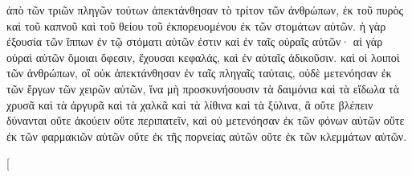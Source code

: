 \begin{pages}
\begin{Rightside}
		\pend
		\pstart
		ἀπὸ τῶν τριῶν πληγῶν τούτων ἀπεκτάνθησαν τὸ τρίτον τῶν ἀνθρώπων, ἐκ τοῦ πυρὸς καὶ τοῦ καπνοῦ καὶ τοῦ θείου τοῦ ἐκπορευομένου ἐκ τῶν στομάτων αὐτῶν. ἡ γὰρ ἐξουσία τῶν ἵππων ἐν τῷ στόματι αὐτῶν ἐστιν καὶ ἐν ταῖς οὐραῖς αὐτῶν· αἱ γὰρ οὐραὶ αὐτῶν ὅμοιαι ὄφεσιν, ἔχουσαι κεφαλάς, καὶ ἐν αὐταῖς ἀδικοῦσιν.
		\pend
		\pstart
		καὶ οἱ λοιποὶ τῶν ἀνθρώπων, οἳ οὐκ ἀπεκτάνθησαν ἐν ταῖς πληγαῖς ταύταις, οὐδὲ μετενόησαν ἐκ τῶν ἔργων τῶν χειρῶν αὐτῶν, ἵνα μὴ προσκυνήσουσιν τὰ δαιμόνια καὶ τὰ εἴδωλα τὰ χρυσᾶ καὶ τὰ ἀργυρᾶ καὶ τὰ χαλκᾶ καὶ τὰ λίθινα καὶ τὰ ξύλινα, ἃ οὔτε βλέπειν δύνανται οὔτε ἀκούειν οὔτε περιπατεῖν, καὶ οὐ μετενόησαν ἐκ τῶν φόνων αὐτῶν οὔτε ἐκ τῶν φαρμακιῶν αὐτῶν οὔτε ἐκ τῆς πορνείας αὐτῶν οὔτε ἐκ τῶν κλεμμάτων αὐτῶν.
		\pend
        \endnumbering
    \end{Rightside}
    \begin{Leftside}
        \beginnumbering
        \pstart[

\end{Leftside}
\end{pages}
